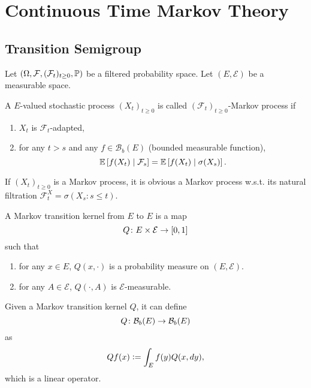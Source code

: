 \chapter{Continuous Time Markov Theory}

\section{Transition Semigroup}

Let $(\Omega, \mathcal{F}, (\mathcal{F}_t)_{t \geq 0}, \mathbb{P})$ be a filtered probability space. Let $(E,\mathcal{E})$ be a measurable space. 

\begin{defn}
    A $E$-valued stochastic process $(X_t)_{t \geq 0}$ is called $(\mathcal{F}_t)_{t \geq 0}$-Markov process if
    \begin{enumerate}[label=(\roman*)]
        \item $X_t$ is $\mathcal{F}_t$-adapted,
        \item for any $t > s$ and any $f \in \mathcal{B}_b(E)$ (bounded measurable function),
        \begin{equation*}
            \mathbb{E}\left[f(X_t) \mid \mathcal{F}_s\right] = \mathbb{E}\left[f(X_t) \mid \sigma(X_s)\right].
        \end{equation*}
    \end{enumerate}
\end{defn}
\begin{rmk}
    If $(X_t)_{t \geq 0}$ is a Markov process, it is obvious a Markov process w.s.t. its natural filtration $\mathcal{F}^X_t = \sigma(X_s \colon s\leq t)$.
\end{rmk}

\begin{defn}
    A Markov transition kernel from $E$ to $E$ is a map
    \begin{equation*}
        Q \colon E \times \mathcal{E} \rightarrow [0,1]
    \end{equation*}
    such that
    \begin{enumerate}[label=(\roman*)]
        \item for any $x \in E$, $Q(x,\cdot)$ is a probability measure on $(E,\mathcal{E})$.
        \item for any $A \in \mathcal{E}$, $Q(\cdot, A)$ is $\mathcal{E}$-measurable.
    \end{enumerate}
\end{defn}
\begin{rmk}
    Given a Markov transition kernel $Q$, it can define
    \begin{equation*}
        Q \colon \mathcal{B}_b(E) \rightarrow \mathcal{B}_b(E)
    \end{equation*}
    as
    \begin{equation*}
        Qf(x) \vcentcolon= \int_E f(y) Q(x,dy),
    \end{equation*}
    which is a linear operator.
\end{rmk}


